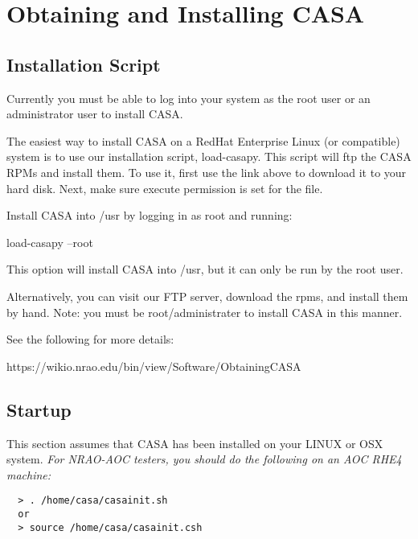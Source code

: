 

\chapter[Appendix: Obtaining and Installing CASA]{Obtaining and Installing CASA}
\label{chapter:install}

\section{Installation Script}
\label{section:install.script}

Currently you must be able to log into your system as the root user or
an administrator user to install CASA. 

The easiest way to install CASA on a RedHat Enterprise Linux (or
compatible) system is to use our installation script,
load-casapy. This script will ftp the CASA RPMs and install them. To
use it, first use the link above to download it to your hard
disk. Next, make sure execute permission is set for the file. 

Install CASA into /usr by logging in as root and running:

load-casapy --root

This option will install CASA into /usr, but it can only be run by the root user.

Alternatively, you can visit our FTP server, download the rpms, and
install them by hand. Note: you must be root/administrater to install
CASA in this manner. 

See the following for more details:

https://wikio.nrao.edu/bin/view/Software/ObtainingCASA

\section{Startup}
\label{section:install.startup}

This section assumes that CASA has been installed on your LINUX or OSX
system. {\it For NRAO-AOC testers, you should do the following on an AOC
RHE4 machine:} 

\small
\begin{verbatim}
  > . /home/casa/casainit.sh
  or
  > source /home/casa/casainit.csh
\end{verbatim}
\normalsize


